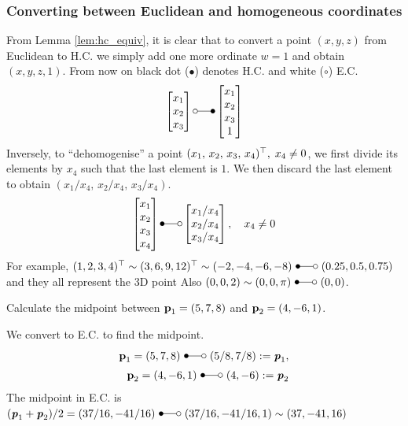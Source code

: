 \documentclass[a4paper]{article}
\begin{document}
\subsubsection{Converting between Euclidean and homogeneous coordinates}

From Lemma \ref{lem:hc_equiv}, it is clear that to convert a point $(x,y,z)$ from Euclidean to H.C. we simply add one more ordinate $w=1$ and obtain $(x,y,z,1)$. From now on black dot ($\bullet$) denotes H.C. and white ($\circ$) E.C.
\begin{equation}
\begin{bmatrix}
x_1 \\ x_2 \\ x_3    
\end{bmatrix}
\laplace
\begin{bmatrix}
x_1 \\ x_2 \\ x_3 \\ 1
\end{bmatrix}
\end{equation}
Inversely, to ``dehomogenise'' a point $(x_1,\, x_2,\, x_3,\, x_4)^{\top}, \; x_4 \neq 0$, we first divide its elements by $x_4$ such that the last element is $1$. We then discard the last element to obtain $(x_1/x_4,\, x_2/x_4,\,  x_3/x_4)$.
\begin{equation}
\begin{bmatrix}
    x_1 \\ x_2 \\ x_3 \\ x_4
\end{bmatrix}
\Laplace
\begin{bmatrix}
    x_1/x_4 \\ x_2/x_4 \\ x_3/x_4
\end{bmatrix}, \quad x_4 \neq 0
\end{equation}
For example, $(1,2,3,4)\t \sim (3,6,9,12)\t \sim (-2,-4,-6,-8)\ \Laplace \ (0.25, 0.5, 0.75)$ and they all represent the 3D point Also $(0,0,2) \sim (0,0,\pi)\ \Laplace \ (0,0)$.
\begin{exmp}
Calculate the midpoint between $\textbf{\textup{p}}_1=(5,7,8)$ and $\textbf{\textup{p}}_2 = (4,-6,1)$.
\end{exmp}
\begin{soln}
We convert to E.C. to find the midpoint.
\begin{align*}
\textbf{\textup{p}}_1 = (5,7,8)\ \Laplace \ (5/8,7/8) := \textbf{\textit{p}}_1
,\\
\textbf{\textup{p}}_2 = (4,-6,1)\ \Laplace \ (4,-6) := \textbf{\textit{p}}_2
\end{align*}
The midpoint in E.C. is $(\textbf{\textit{p}}_1 + \textbf{\textit{p}}_2)/2 = (37/16,-41/16) \  \Laplace \ (37/16, -41/16, 1) \sim (37, -41, 16) $ 
\end{soln}
\end{document}
